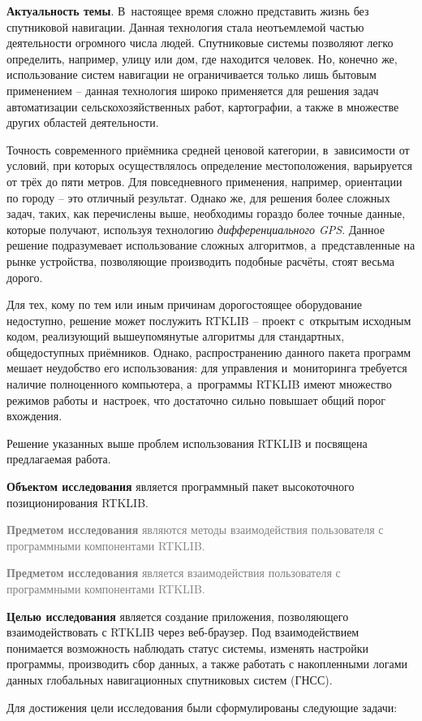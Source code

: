 
\textbf{Актуальность темы}. В~настоящее время сложно представить жизнь без спутниковой навигации. Данная технология стала неотъемлемой частью деятельности огромного числа людей. Спутниковые системы позволяют легко определить, например, улицу или дом, где находится человек. Но, конечно же, использование систем навигации не ограничивается только лишь бытовым применением -- данная технология широко применяется для решения задач автоматизации сельскохозяйственных работ, картографии, а также в множестве других областей деятельности. \par

Точность современного приёмника средней ценовой категории, в~зависимости от условий, при которых осуществлялось определение местоположения, варьируется от трёх до пяти метров. Для повседневного применения, например, ориентации по городу -- это отличный результат. Однако же, для решения более сложных задач, таких, как перечислены выше, необходимы гораздо более точные данные, которые получают, используя технологию \textit{дифференциального GPS}. Данное решение подразумевает использование сложных алгоритмов, а~представленные на рынке устройства, позволяющие производить подобные расчёты, стоят весьма дорого. \par

Для тех, кому по тем или иным причинам дорогостоящее оборудование недоступно, решение может послужить RTKLIB -- проект с~открытым исходным кодом, реализующий вышеупомянутые алгоритмы для стандартных, общедоступных приёмников. Однако, распространению данного пакета программ мешает неудобство его использования: для управления и~мониторинга требуется наличие полноценного компьютера, а~программы RTKLIB имеют множество режимов работы и~настроек, что достаточно сильно повышает общий порог вхождения. \par

Решение указанных выше проблем использования RTKLIB и посвящена предлагаемая работа. \par

\textbf{Объектом исследования} является программный пакет высокоточного позиционирования RTKLIB. \par

\textcolor{Gray}{\textbf{Предметом исследования} являются методы взаимодействия пользователя с программными компонентами RTKLIB.} \par

\textcolor{Gray}{\textbf{Предметом исследования} является взаимодействия пользователя с программными компонентами RTKLIB.} \par

\textbf{Целью исследования} является создание приложения, позволяющего взаимодействовать с RTKLIB через веб-браузер. Под взаимодействием понимается возможность наблюдать статус системы, изменять настройки программы, производить сбор данных, а также работать с накопленными логами данных глобальных навигационных спутниковых систем (ГНСС). \par

Для достижения цели исследования были сформулированы следующие задачи: